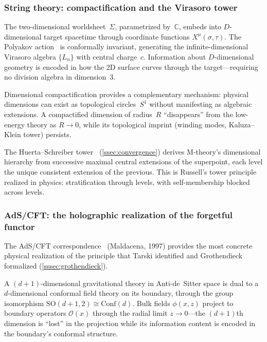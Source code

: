 \subsubsection{String theory: compactification and the Virasoro
tower}\label{sssec:strings}

The two-dimensional worldsheet~$\Sigma$, parametrized
by~$\mathbb{C}$, embeds into $D$-dimensional target spacetime through
coordinate functions $X^\mu(\sigma,\tau)$.  The Polyakov action~\cite{polyakov81} is
conformally invariant, generating the infinite-dimensional Virasoro
algebra $\{L_n\}$ with central charge~$c$.  Information about
$D$-dimensional geometry is encoded in how the 2D surface curves
through the target---requiring no division algebra in dimension~3.

Dimensional compactification provides a complementary mechanism:
physical dimensions can exist as topological circles~$S^1$ without
manifesting as algebraic extensions.  A compactified dimension of
radius~$R$ ``disappears'' from the low-energy theory as $R \to 0$,
while its topological imprint (winding modes, Kaluza--Klein tower)
persists.

The Huerta--Schreiber tower~\cite{huerta2018m} (\cref{ssec:convergence}) derives M-theory's dimensional
hierarchy from successive maximal central extensions of the
superpoint, each level the unique consistent extension of the
previous.  This is Russell's tower principle realized in physics:
stratification through levels, with self-membership blocked across
levels.


\subsubsection{AdS/CFT: the holographic realization of the forgetful
functor}\label{sssec:adscft}

The AdS/CFT correspondence~\cite{maldacena98} (Maldacena, 1997) provides the most
concrete physical realization of the principle that Tarski identified
and Grothendieck formalized (\cref{sssec:grothendieck}).

A $(d{+}1)$-dimensional gravitational
theory in Anti-de~Sitter space is dual to a $d$-dimensional conformal
field theory on its boundary, through the group isomorphism
$\mathrm{SO}(d{+}1, 2) \cong \mathrm{Conf}(d)$.  Bulk fields
$\phi(x,z)$ project to boundary operators $\mathcal{O}(x)$ through
the radial limit $z \to 0$---the $(d+1)$th dimension is ``lost'' in
the projection while its information content is encoded in the
boundary's conformal structure.

